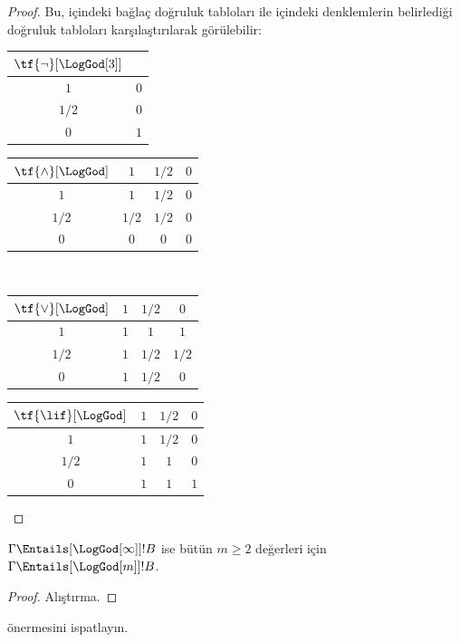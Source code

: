 \documentclass[../../../include/open-logic-section]{subfiles}
\begin{document}
\begin{proof}
  Bu,  içindeki bağlaç doğruluk tabloları ile
   içindeki denklemlerin belirlediği doğruluk tabloları
  karşılaştırılarak görülebilir:
  \begin{center}
    \begin{tabular}{c|c} 
      $\tf{\lnot}[\LogGod[3]]$ & \\ 
      \hline  
      $1$ & $0$ \\ 
      $1/2$ & $0$ \\
      $0$ & $1$ 
    \end{tabular}
    \quad
    \begin{tabular}{c|ccc} 
      $\tf{\land}[\LogGod]$ & $1$ & $1/2$ & $0$ \\ 
      \hline 
      $1$ & $1$ & $1/2$ & $0$ \\ 
      $1/2$ & $1/2$ & $1/2$ & $0$\\ 
      $0$ & $0$ & $0$ & $0$ 
    \end{tabular}
    \\[2ex]
    \begin{tabular}{c|ccc} 
      $\tf{\lor}[\LogGod]$ & $1$ & $1/2$ & $0$ \\ 
      \hline 
      $1$ & $1$ & $1$ & $1$ \\ 
      $1/2$ & $1$ & $1/2$ & $1/2$ \\
      $0$ & $1$ & $1/2$ & $0$ 
    \end{tabular}
    \quad
    \begin{tabular}{c|ccc} 
      $\tf{\lif}[\LogGod]$ & $1$ & $1/2$ & $0$ \\ 
      \hline 
      $1$ & $1$ & $1/2$ & $0$ \\ 
      $1/2$ & $1$ & $1$ & $0$  \\ 
      $0$ & $1$ & $1$ & $1$ 
    \end{tabular}
  \end{center} 
\end{proof}

\begin{prop}
  $\Gamma \Entails[\LogGod[\infty]] !B$ ise bütün $m \ge 2$ değerleri için
  $\Gamma \Entails[\LogGod[m]] !B$.
\end{prop}

\begin{proof}
  Alıştırma.
\end{proof}

\begin{prob}
   önermesini ispatlayın.
\end{prob}
\end{document}
